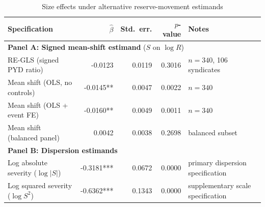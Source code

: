 \begin{table}[htbp]
\centering
\caption{Size effects under alternative reserve-movement estimands}
\label{tab:size_severity}
\begin{tabular}{lrrrp{4cm}}
\toprule
\textbf{Specification} & $\hat{\beta}$ & \textbf{Std.\ err.} & \textbf{$p$-value} & \textbf{Notes} \\
\midrule
\multicolumn{5}{l}{\textbf{Panel A: Signed mean-shift estimand} ($S$ on $\log R$)} \\
\midrule
RE-GLS (signed PYD ratio) & -0.0123 & 0.0119 & 0.3016 & $n=340$, 106 syndicates \\
Mean shift (OLS, no controls) & -0.0145** & 0.0047 & 0.0022 & $n=340$ \\
Mean shift (OLS + event FE) & -0.0160** & 0.0049 & 0.0011 & $n=340$ \\
Mean shift (balanced panel) & 0.0042 & 0.0038 & 0.2698 & balanced subset \\
\midrule
\multicolumn{5}{l}{\textbf{Panel B: Dispersion estimands}} \\
\midrule
Log absolute severity ($\log |S|$) & -0.3181*** & 0.0672 & 0.0000 & primary dispersion specification \\
Log squared severity ($\log S^2$) & -0.6362*** & 0.1343 & 0.0000 & supplementary scale specification \\
\bottomrule
\end{tabular}
\end{table}
